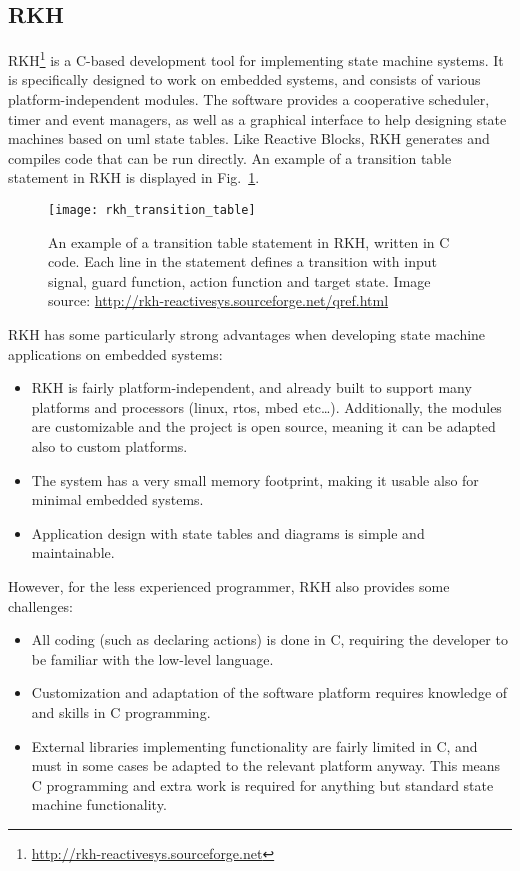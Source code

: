 \subsection{RKH}
\label{sec:rkh_state_machine}
RKH\footnote{\url{http://rkh-reactivesys.sourceforge.net}} is a C-based development tool for implementing state machine systems. It is specifically designed to work on embedded systems, and consists of various platform-independent modules. The software provides a cooperative scheduler, timer and event managers, as well as a graphical interface to help designing state machines based on \gls{uml} state tables. Like Reactive Blocks, RKH generates and compiles code that can be run directly. An example of a transition table statement in RKH is displayed in Fig.~\ref{figure:rkh_transition}.

\begin{figure}[htp]
	\centering
	\texttt{[image: rkh\_transition\_table]}
	\caption[A transition table statement in RKH]{An example of a transition table statement in RKH, written in C code. Each line in the statement defines a transition with input signal, guard function, action function and target state. Image source: \url{http://rkh-reactivesys.sourceforge.net/qref.html}}
	\label{figure:rkh_transition}
\end{figure}

\noindent
RKH has some particularly strong advantages when developing state machine applications on embedded systems:

\begin{itemize}
\item RKH is fairly platform-independent, and already built to support many platforms and processors (linux, \gls{rtos}, mbed etc…). Additionally, the modules are customizable and the project is open source, meaning it can be adapted also to custom platforms.
\item The system has a very small memory footprint, making it usable also for minimal embedded systems.
\item Application design with state tables and diagrams is simple and maintainable.
\end{itemize}

\noindent
However, for the less experienced programmer, RKH also provides some challenges:

\begin{itemize}
	\item All coding (such as declaring actions) is done in C, requiring the developer to be familiar with the low-level language.
	\item Customization and adaptation of the software platform requires knowledge of and skills in C programming.
	\item External libraries implementing functionality are fairly limited in C, and must in some cases be adapted to the relevant platform anyway. This means C programming and extra work is required for anything but standard state machine functionality.
\end{itemize}

